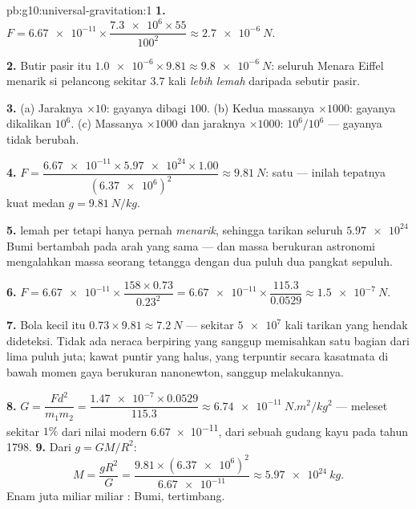 \begin{solution}{pb:g10:universal-gravitation:1}
\textbf{1.} $F = \num{6.67e-11} \times
\dfrac{\num{7.3e6} \times 55}{100^2} \approx \qty{2.7e-6}{N}$.

\textbf{2.} Butir pasir itu 
$\num{1.0e-6} \times 9.81 \approx \qty{9.8e-6}{N}$: seluruh Menara
Eiffel menarik si pelancong sekitar $3.7$ kali \emph{lebih lemah}
daripada  sebutir pasir.

\textbf{3.} (a) Jaraknya $\times 10$: gayanya dibagi $100$.
(b) Kedua massanya $\times 1000$: gayanya dikalikan $10^6$.
(c) Massanya $\times 1000$ dan jaraknya $\times 1000$:
$10^6 / 10^6$ --- gayanya tidak berubah.

\textbf{4.} $F = \dfrac{\num{6.67e-11} \times \num{5.97e24} \times
1.00}{(\num{6.37e6})^2} \approx \qty{9.81}{N}$:  satu 
--- inilah tepatnya kuat medan $g = \qty{9.81}{N/kg}$.

\textbf{5.}  lemah per  tetapi hanya pernah
\emph{menarik}, sehingga tarikan seluruh $\num{5.97e24}$  Bumi
bertambah pada arah yang sama --- dan massa berukuran astronomi
mengalahkan massa seorang tetangga dengan dua puluh dua pangkat
sepuluh.

\textbf{6.} $F = \num{6.67e-11} \times \dfrac{158 \times 0.73}{0.23^2}
= \num{6.67e-11} \times \dfrac{115.3}{0.0529}
\approx \qty{1.5e-7}{N}$.

\textbf{7.} Bola kecil itu 
$0.73 \times 9.81 \approx \qty{7.2}{N}$ --- sekitar $\num{5e7}$ kali
tarikan yang hendak dideteksi. Tidak ada neraca berpiring yang sanggup
memisahkan satu bagian dari lima puluh juta; kawat puntir yang halus,
yang terpuntir secara kasatmata di bawah momen gaya berukuran
nanonewton, sanggup melakukannya.

\textbf{8.} $G = \dfrac{F d^2}{m_1 m_2}
= \dfrac{\num{1.47e-7} \times 0.0529}{115.3}
\approx \qty{6.74e-11}{N.m^2/kg^2}$ --- meleset sekitar $1\%$ dari
nilai modern \num{6.67e-11}, dari sebuah gudang kayu pada tahun 1798.
\textbf{9.} Dari $g = G M / R^2$:
\[
M = \frac{g R^2}{G}
= \frac{9.81 \times (\num{6.37e6})^2}{\num{6.67e-11}}
\approx \qty{5.97e24}{kg}.
\]
Enam juta miliar miliar : Bumi, tertimbang.


\end{solution}
